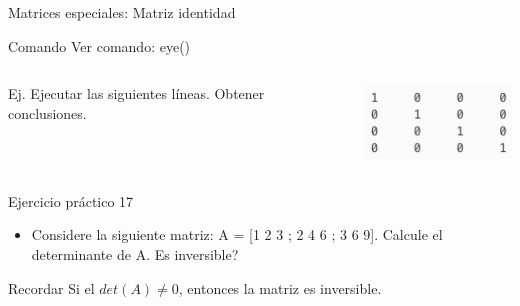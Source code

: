 \documentclass{bredelebeamer}
\begin{document}
\begin{frame}{Matrices especiales: Matriz identidad}
\begin{exampleblock}{Comando}
Ver comando: eye()
\end{exampleblock}
\begin{columns}
\begin{column}{0.5\textwidth}
Ej. Ejecutar las siguientes líneas. Obtener conclusiones.

\end{column}
\begin{column}{0.5\textwidth}
\begin{center}
\includegraphics[scale=0.5]{images/pantalla3.png}
\end{center}
\end{column}
\end{columns}
\end{frame}

\begin{frame}{Ejercicio práctico 17}
\begin{center}
\begin{itemize}
\item Considere la siguiente matriz: A = [1 2 3 ; 2 4 6 ; 3 6 9]. Calcule el determinante de A. Es inversible?
\end{itemize}
\end{center}
\begin{block}{Recordar}
Si el $det(A) \neq 0$, entonces la matriz es inversible.
\end{block}
\end{frame}
\end{document}
